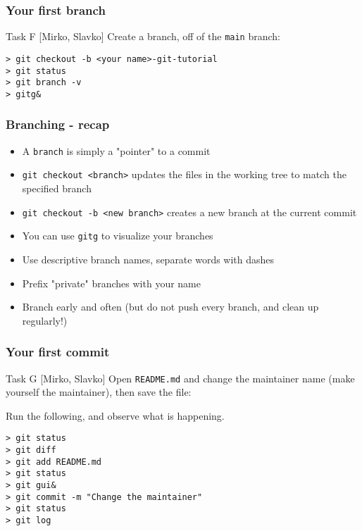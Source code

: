 

\begin{frame}[fragile]
	\frametitle{Your first branch}
	
	\begin{block}{Task F [Mirko, Slavko]}
	Create a branch, off of the \texttt{main} branch:

	\begin{verbatim}
> git checkout -b <your name>-git-tutorial
> git status
> git branch -v
> gitg&
	\end{verbatim}
	
	\end{block}
	
\end{frame}



\begin{frame}[fragile]

\frametitle{Branching - recap}

\begin{itemize}
\item A \texttt{branch} is simply a "pointer" to a commit
\item \texttt{git checkout <branch>} updates the files in the working tree to match the specified branch
\item \texttt{git checkout -b <new branch>} creates a new branch at the current commit
\item You can use \texttt{gitg} to visualize your branches
\item Use descriptive branch names, separate words with dashes
\item Prefix "private" branches with your name
\item Branch early and often (but do not push every branch, and clean up regularly!)
\end{itemize}	
	
\end{frame}




\begin{frame}[fragile]
	\frametitle{Your first commit}
	
	\begin{block}{Task G [Mirko, Slavko]}
	Open \texttt{README.md} and change the maintainer name (make yourself the maintainer), then save the file:

Run the following, and observe what is happening.

	\begin{verbatim}
> git status
> git diff
> git add README.md
> git status
> git gui&
> git commit -m "Change the maintainer"
> git status
> git log
	\end{verbatim}
	
	\end{block}
	
\end{frame}

